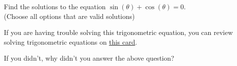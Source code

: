\documentclass{ximera}
\begin{document}
\begin{problem} 

\begin{problem}
    Find the solutions to the equation $\sin(\theta) + \cos(\theta) = 0$. \\ (Choose all options that are valid solutions)
    
    \begin{hint}
    If you are having trouble solving this trigonometric equation, you can review solving trigonometric equations on \href{https://ximera.osu.edu/math160fa17/m160prerequisites/prerequisiteVideos/trigSolvingEquations}{this card}.
    \end{hint}

  \begin{selectAll}
      
      
  \end{selectAll}
  
\end{problem}

\begin{question}
  
  If you didn't, why didn't you answer the above question?
  
  \begin{multipleChoice}
      

  \end{multipleChoice}
  
\end{question}
  
\end{problem}
\end{document}
